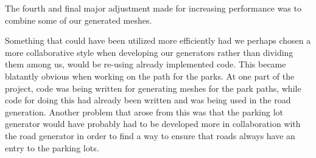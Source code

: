 The fourth and final major adjustment made for increasing performance was to combine some of our generated meshes. 

Something that could have been utilized more efficiently had we perhaps chosen a more collaborative style when developing our generators rather than dividing them among us, would be re-using already implemented code. 
This became blatantly obvious when working on the path for the parks.
At one part of the project, code was being written for generating meshes for the park paths, while code for doing this had already been written and was being used in the road generation. 
Another problem that arose from this was that the parking lot generator would have probably had to be developed more in collaboration with the road generator in order to find a way to ensure that roads always have an entry to the parking lots.

